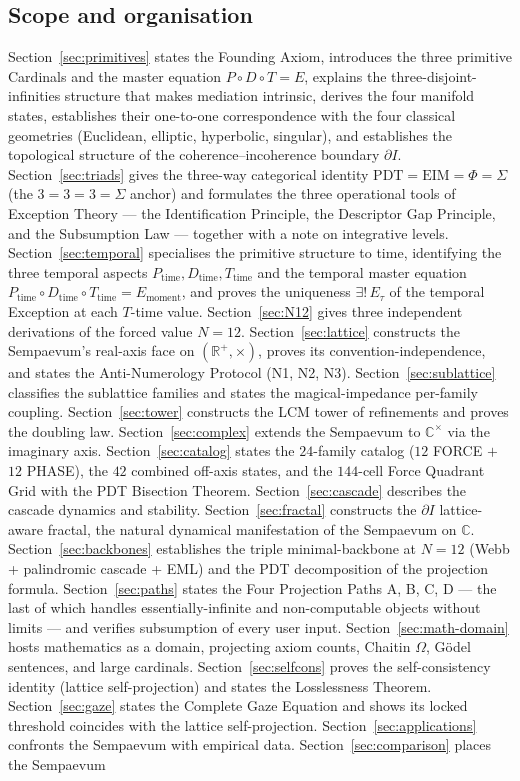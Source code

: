 \documentclass[11pt,a4paper]{article}
\theoremstyle{definition}
\theoremstyle{remark}
\newcommand{\R}{\mathbb{R}}
\newcommand{\C}{\mathbb{C}}
\begin{document}
\subsection{Scope and organisation}

Section~\ref{sec:primitives} states the Founding Axiom, introduces the three primitive Cardinals and the master equation $P\circ D\circ T = E$, explains the three-disjoint-infinities structure that makes mediation intrinsic, derives the four manifold states, establishes their one-to-one correspondence with the four classical geometries (Euclidean, elliptic, hyperbolic, singular), and establishes the topological structure of the coherence--incoherence boundary $\partial I$. Section~\ref{sec:triads} gives the three-way categorical identity $\mathrm{PDT} = \mathrm{EIM} = \Phi = \Sigma$ (the $3=3=3=\Sigma$ anchor) and formulates the three operational tools of Exception Theory --- the Identification Principle, the Descriptor Gap Principle, and the Subsumption Law --- together with a note on integrative levels. Section~\ref{sec:temporal} specialises the primitive structure to time, identifying the three temporal aspects $P_{\text{time}}, D_{\text{time}}, T_{\text{time}}$ and the temporal master equation $P_{\text{time}} \circ D_{\text{time}} \circ T_{\text{time}} = E_{\text{moment}}$, and proves the uniqueness $\exists!\,E_{\tau}$ of the temporal Exception at each $T$-time value. Section~\ref{sec:N12} gives three independent derivations of the forced value $N=12$. Section~\ref{sec:lattice} constructs the Sempaevum's real-axis face on $(\R^{+},\times)$, proves its convention-independence, and states the Anti-Numerology Protocol (N1, N2, N3). Section~\ref{sec:sublattice} classifies the sublattice families and states the magical-impedance per-family coupling. Section~\ref{sec:tower} constructs the LCM tower of refinements and proves the doubling law. Section~\ref{sec:complex} extends the Sempaevum to $\C^{\times}$ via the imaginary axis. Section~\ref{sec:catalog} states the $24$-family catalog ($12$ FORCE $+$ $12$ PHASE), the $42$ combined off-axis states, and the $144$-cell Force Quadrant Grid with the PDT Bisection Theorem. Section~\ref{sec:cascade} describes the cascade dynamics and stability. Section~\ref{sec:fractal} constructs the $\partial I$ lattice-aware fractal, the natural dynamical manifestation of the Sempaevum on $\C$. Section~\ref{sec:backbones} establishes the triple minimal-backbone at $N=12$ (Webb + palindromic cascade + EML) and the PDT decomposition of the projection formula. Section~\ref{sec:paths} states the Four Projection Paths A, B, C, D --- the last of which handles essentially-infinite and non-computable objects without limits --- and verifies subsumption of every user input. Section~\ref{sec:math-domain} hosts mathematics as a domain, projecting axiom counts, Chaitin $\Omega$, G\"odel sentences, and large cardinals. Section~\ref{sec:selfcons} proves the self-consistency identity (lattice self-projection) and states the Losslessness Theorem. Section~\ref{sec:gaze} states the Complete Gaze Equation and shows its locked threshold coincides with the lattice self-projection. Section~\ref{sec:applications} confronts the Sempaevum with empirical data. Section~\ref{sec:comparison} places the Sempaevum 
\end{document}
